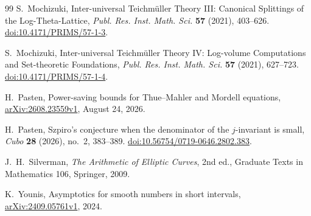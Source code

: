 \documentclass[11pt]{amsart}
\theoremstyle{definition}
\theoremstyle{remark}
\begin{document}
\begin{thebibliography}{99}
S.~Mochizuki, Inter-universal Teichm\"uller Theory III:
Canonical Splittings of the Log-Theta-Lattice,
\emph{Publ. Res. Inst. Math. Sci.} \textbf{57} (2021), 403--626.
\href{https://doi.org/10.4171/PRIMS/57-1-3}{doi:10.4171/PRIMS/57-1-3}.

S.~Mochizuki, Inter-universal Teichm\"uller Theory IV:
Log-volume Computations and Set-theoretic Foundations,
\emph{Publ. Res. Inst. Math. Sci.} \textbf{57} (2021), 627--723.
\href{https://doi.org/10.4171/PRIMS/57-1-4}{doi:10.4171/PRIMS/57-1-4}.

H.~Pasten, Power-saving bounds for Thue--Mahler and Mordell equations,
\href{https://arxiv.org/abs/2608.23559v1}{arXiv:2608.23559v1}, August 24, 2026.

H.~Pasten, Szpiro's conjecture when the denominator of the $j$-invariant
is small, \emph{Cubo} \textbf{28} (2026), no.~2, 383--389.
\href{https://doi.org/10.56754/0719-0646.2802.383}{doi:10.56754/0719-0646.2802.383}.

J.~H.~Silverman, \emph{The Arithmetic of Elliptic Curves},
2nd ed., Graduate Texts in Mathematics 106, Springer, 2009.

K.~Younis, Asymptotics for smooth numbers in short intervals,
\href{https://arxiv.org/abs/2409.05761v1}{arXiv:2409.05761v1}, 2024.

\end{thebibliography}
\end{document}
